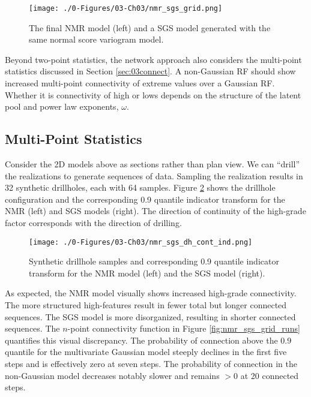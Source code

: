 \begin{figure}[htb!]
    \centering
    \texttt{[image: ./0-Figures/03-Ch03/nmr\_sgs\_grid.png]}
    \caption{ The final \gls{NMR} model (left) and a \gls{SGS} model generated with the same normal score variogram model. }
    \label{fig:nmr_sgs_grid}
\end{figure}

Beyond two-point statistics, the network approach also considers the multi-point statistics discussed in Section \ref{sec:03connect}. A non-Gaussian \gls{RF} should show increased multi-point connectivity of extreme values over a Gaussian \gls{RF}. Whether it is connectivity of high or lows depends on the structure of the latent pool and power law exponents, $\omega$.

\subsection{Multi-Point Statistics}
\label{subsec:03multipt}

Consider the \gls{2D} models above as sections rather than plan view. We can ``drill'' the realizations to generate sequences of data. Sampling the realization results in 32 synthetic drillholes, each with 64 samples. Figure \ref{fig:nmr_sgs_dh_cont_ind} shows the drillhole configuration and the corresponding 0.9 quantile indicator transform for the \gls{NMR} (left) and \gls{SGS} models (right). The direction of continuity of the high-grade factor corresponds with the direction of drilling.

\begin{figure}[htb!]
    \centering
    \texttt{[image: ./0-Figures/03-Ch03/nmr\_sgs\_dh\_cont\_ind.png]}
    \caption{ Synthetic drillhole samples and corresponding 0.9 quantile indicator transform for the \gls{NMR} model (left) and the \gls{SGS} model (right).}
    \label{fig:nmr_sgs_dh_cont_ind}
\end{figure}

As expected, the \gls{NMR} model visually shows increased high-grade connectivity. The more structured high-features result in fewer total but longer connected sequences. The \gls{SGS} model is more disorganized, resulting in shorter connected sequences. The $n$-point connectivity function in Figure \ref{fig:nmr_sgs_grid_runs} quantifies this visual discrepancy. The probability of connection above the 0.9 quantile for the multivariate Gaussian model steeply declines in the first five steps and is effectively zero at seven steps. The probability of connection in the non-Gaussian model decreases notably slower and remains $> 0$ at 20 connected steps.

